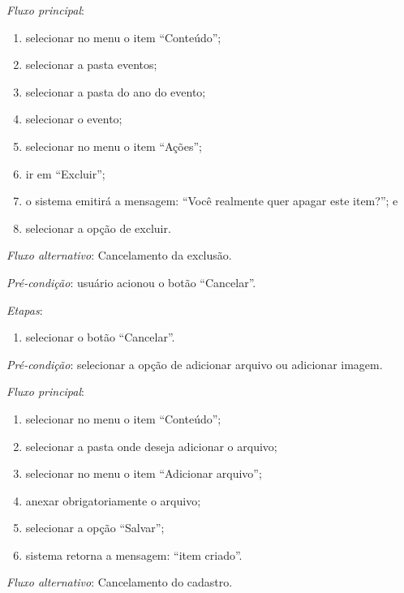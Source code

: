 \noindent \textit{Fluxo principal}:

\begin{enumerate}
    \item selecionar no menu o item ``Conteúdo'';
    \item selecionar a pasta eventos;
    \item selecionar a pasta do ano do evento;
    \item selecionar o evento;
    \item selecionar no menu o item ``Ações'';
    \item ir em ``Excluir'';
    \item o sistema emitirá a mensagem: ``Você realmente quer apagar este item?''; e
    \item selecionar a opção de excluir.
\end{enumerate}

\noindent \textit{Fluxo alternativo}: Cancelamento da exclusão.

\noindent \textit{Pré-condição}: usuário acionou o botão ``Cancelar''.

\noindent \textit{Etapas}:

\begin{enumerate}
    \item selecionar o botão ``Cancelar''.
\end{enumerate}



\vspace{0.7cm}

\noindent \textit{Pré-condição}: selecionar a opção de adicionar arquivo ou adicionar imagem.

\noindent \textit{Fluxo principal}:

\begin{enumerate}
    \item selecionar no menu o item ``Conteúdo'';
    \item selecionar a pasta onde deseja adicionar o arquivo;
    \item selecionar no menu o item ``Adicionar arquivo'';
    \item anexar obrigatoriamente o arquivo;
    \item selecionar a opção ``Salvar'';
    \item sistema retorna a mensagem: ``item criado''.
\end{enumerate}

\noindent \textit{Fluxo alternativo}: Cancelamento do cadastro.

